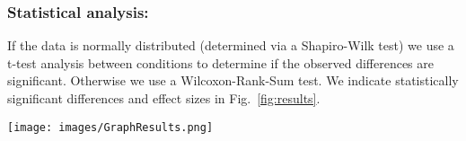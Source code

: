 \subsubsection{Statistical analysis:}


If the data is normally distributed (determined via a Shapiro-Wilk test) we use a t-test analysis between conditions to determine if the observed differences are significant. Otherwise we use a Wilcoxon-Rank-Sum test. We indicate statistically significant differences and effect sizes in Fig.~\ref{fig:results}.

\begin{figure*}[t]
  \centering
  \texttt{[image: images/GraphResults.png]}
  \caption{Results: accuracy and time. Error bars show one standard error. Statistically significant results and effect sizes are also marked. Tasks $14$, $11$ had no time limits.}
	\label{fig:results}
\end{figure*}


